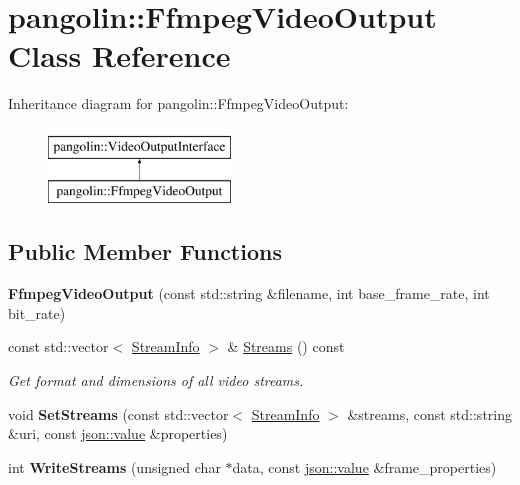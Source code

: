 \hypertarget{classpangolin_1_1_ffmpeg_video_output}{}\section{pangolin\+:\+:Ffmpeg\+Video\+Output Class Reference}
\label{classpangolin_1_1_ffmpeg_video_output}
Inheritance diagram for pangolin\+:\+:Ffmpeg\+Video\+Output\+:\begin{figure}[H]
\begin{center}
\leavevmode
\includegraphics[height=2.000000cm]{classpangolin_1_1_ffmpeg_video_output}
\end{center}
\end{figure}
\subsection*{Public Member Functions}
\begin{DoxyCompactItemize}
\item 
{\bfseries Ffmpeg\+Video\+Output} (const std\+::string \&filename, int base\+\_\+frame\+\_\+rate, int bit\+\_\+rate)\hypertarget{classpangolin_1_1_ffmpeg_video_output_a71dac37bc51715e713c1d62603d6d4b3}{}\label{classpangolin_1_1_ffmpeg_video_output_a71dac37bc51715e713c1d62603d6d4b3}

\item 
const std\+::vector$<$ \hyperlink{classpangolin_1_1_stream_info}{Stream\+Info} $>$ \& \hyperlink{classpangolin_1_1_ffmpeg_video_output_afd0b368ca1d399254f7f46de4aad952b}{Streams} () const \hypertarget{classpangolin_1_1_ffmpeg_video_output_afd0b368ca1d399254f7f46de4aad952b}{}\label{classpangolin_1_1_ffmpeg_video_output_afd0b368ca1d399254f7f46de4aad952b}

\begin{DoxyCompactList}\small\item\em Get format and dimensions of all video streams. \end{DoxyCompactList}\item 
void {\bfseries Set\+Streams} (const std\+::vector$<$ \hyperlink{classpangolin_1_1_stream_info}{Stream\+Info} $>$ \&streams, const std\+::string \&uri, const \hyperlink{classpangolin_1_1json_1_1value}{json\+::value} \&properties)\hypertarget{classpangolin_1_1_ffmpeg_video_output_ae9f22da72c1857595684a3d5c211a080}{}\label{classpangolin_1_1_ffmpeg_video_output_ae9f22da72c1857595684a3d5c211a080}

\item 
int {\bfseries Write\+Streams} (unsigned char $\ast$data, const \hyperlink{classpangolin_1_1json_1_1value}{json\+::value} \&frame\+\_\+properties)\hypertarget{classpangolin_1_1_ffmpeg_video_output_ad78e9b60c966b2d2e39536c4a7661163}{}\label{classpangolin_1_1_ffmpeg_video_output_ad78e9b60c966b2d2e39536c4a7661163}

\end{DoxyCompactItemize}
